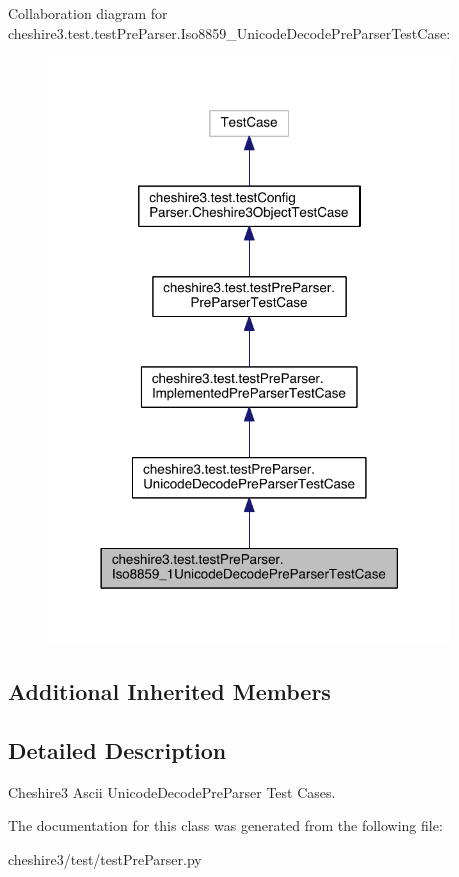 Collaboration diagram for cheshire3.\-test.\-test\-Pre\-Parser.\-Iso8859\-\_\-Unicode\-Decode\-Pre\-Parser\-Test\-Case\-:
\nopagebreak
\begin{figure}[H]
\begin{center}
\leavevmode
\includegraphics[width=302pt]{classcheshire3_1_1test_1_1test_pre_parser_1_1_iso8859__1_unicode_decode_pre_parser_test_case__coll__graph}
\end{center}
\end{figure}
\subsection*{Additional Inherited Members}


\subsection{Detailed Description}
\begin{DoxyVerb}Cheshire3 Ascii UnicodeDecodePreParser Test Cases.\end{DoxyVerb}
 

The documentation for this class was generated from the following file\-:\begin{DoxyCompactItemize}
\item 
cheshire3/test/test\-Pre\-Parser.\-py\end{DoxyCompactItemize}
